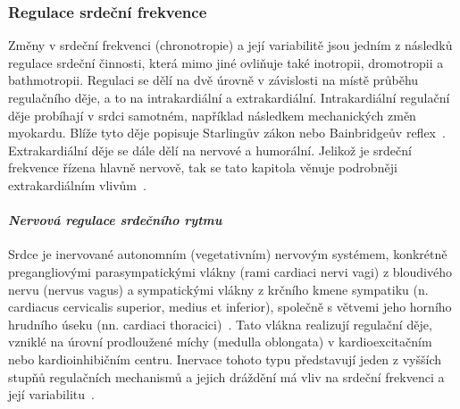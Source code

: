 \subsubsection{Regulace srdeční frekvence}
\label{section:hr_regulation}
Změny v srdeční frekvenci (chronotropie) a její variabilitě jsou jedním z
následků regulace srdeční činnosti, která mimo jiné ovliňuje také inotropii,
dromotropii a bathmotropii. Regulaci se dělí na dvě úrovně v závislosti na místě
průběhu regulačního děje, a to na intrakardiální a extrakardiální.
Intrakardiální regulační děje probíhají v srdci samotném, například následkem
mechanických změn myokardu. Blíže tyto děje popisuje Starlingův zákon nebo
Bainbridgeův reflex~\cite{Kittnar2020}. Extrakardiální děje se dále dělí na
nervové a humorální. Jelikož je srdeční frekvence řízena hlavně nervově, tak se
tato kapitola věnuje podrobněji extrakardiálním vlivům~\cite{Orel2019}.

\paragraph*{\textit{Nervová regulace srdečního rytmu}\\} Srdce je inervované
autonomním (vegetativním) nervovým systémem, konkrétně pregangliovými
parasympatickými vlákny (rami cardiaci nervi vagi) z bloudivého nervu (nervus
vagus) a sympatickými vlákny z krčního kmene sympatiku (n. cardiacus cervicalis
superior, medius et inferior), společně s větvemi jeho horního hrudního úseku
(nn. cardiaci thoracici)~\cite{Dylevsky2013,Kittnar2020}. Tato vlákna realizují
regulační děje, vzniklé na úrovní prodloužené míchy (medulla oblongata) v
kardioexcitačním nebo kardioinhibičním centru. Inervace tohoto typu představují
jeden z vyšších stupňů regulačních mechanismů a jejich dráždění má vliv na
srdeční frekvenci a její variabilitu~\cite{Dylevsky2013,Trojan2002}.

